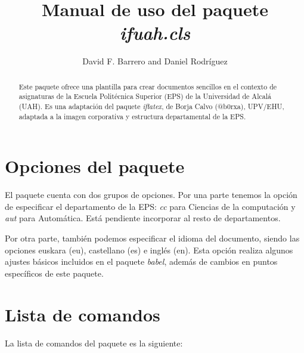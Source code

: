 \documentclass[es,aut]{ifuah}
\title{Manual de uso del paquete \textit{ifuah.cls}}
\author{David F. Barrero and Daniel Rodr\'iguez}
\begin{document}
\ifuahyear{} %
\ifuahmail{} %
\date{} %

\maketitle

\begin{abstract}
Este paquete ofrece una plantilla para crear documentos sencillos en el contexto de asignaturas de la Escuela Polit\'ecnica Superior (EPS) de la Universidad de Alcal\'a (UAH). Es una adaptaci\'on del paquete \textit{iflatex}, de Borja Calvo (@b0rxa), UPV/EHU, adaptada a la imagen corporativa y estructura departamental de la EPS. 
\end{abstract}

\section{Opciones del paquete}
El paquete cuenta con dos grupos de opciones. Por una parte tenemos la opci\'on de especificar el departamento de la EPS: \textit{cc} para Ciencias de la computaci\'on y \textit{aut} para Autom\'atica. Est\'a pendiente incorporar al resto de departamentos.

Por otra parte, tambi\'en podemos especificar el idioma del documento, siendo las opciones euskara (eu), castellano (es) e ingl\'es (en). Esta opci\'on realiza algunos ajustes b\'asicos incluidos en el paquete \textit{babel}, adem\'as de cambios en puntos espec\'ificos de este paquete.

\section{Lista de comandos}

La lista de comandos del paquete es la siguiente:
\end{document}
